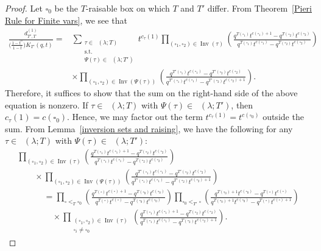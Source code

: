 \documentclass[10pt,a4paper]{amsart}
\numberwithin{equation}{section}
\theoremstyle{definition}
\DeclareMathOperator{\PSYT}{\mathrm{PSYT}_{\geq 0}}
\DeclareMathOperator{\Inv}{\mathrm{Inv}}
\begin{document}
\begin{proof}
 Let $\square_0$ be the $T$-raisable box on which $T$ and $T'$ differ. From Theorem~\ref{Pieri Rule for Finite vars}, we see that
 \begin{align*}
 \frac{d^{(1)}_{T',T}}{\bigl(\frac{1-t^n}{1-t}\bigr)K_{T'}(q,t)} ={}&
 \sum_{\substack{\tau \in \PSYT(\lambda;T) \\ \text{s.t.}\\ \Psi(\tau) \in \PSYT(\lambda;T')}}
 t^{c_{\tau}(1)}
 \prod_{(\square_1,\square_2) \in \Inv(\tau)} \left( \frac{q^{T(\square_1)}t^{c(\square_1) +1} - q^{T(\square_2)}t^{c(\square_2)}}{q^{T(\square_1)}t^{c(\square_1)} - q^{T(\square_2)}t^{c(\square_2)}} \right) \\
 &\times \prod_{(\square_1,\square_2) \in \Inv(\Psi(\tau))} \left( \frac{q^{T'(\square_1)}t^{c(\square_1)} - q^{T'(\square_2)}t^{c(\square_2)}}{q^{T'(\square_1)}t^{c(\square_1)} - q^{T'(\square_2)}t^{c(\square_2) +1}} \right).
\end{align*}
Therefore, it suffices to show that the sum on the right-hand side of the above equation is nonzero. If $\tau \in \PSYT(\lambda;T)$ with $\Psi(\tau) \in \PSYT(\lambda;T')$, then $c_{\tau}(1)= c(\square_0)$. Hence, we may factor out the term $t^{c_{\tau}(1)}= t^{c(\square_0)}$ outside the sum. From Lemma~\ref{inversion sets and raising}, we have the following for any $\tau \in \PSYT(\lambda;T)$ with $\Psi(\tau) \in \PSYT(\lambda;T')$:
\begin{gather*}
 \prod_{(\square_1,\square_2) \in \Inv(\tau)} \left( \frac{q^{T(\square_1)}t^{c(\square_1) +1} - q^{T(\square_2)}t^{c(\square_2)}}{q^{T(\square_1)}t^{c(\square_1)} - q^{T(\square_2)}t^{c(\square_2)}} \right)\\
 \qquad \times
 \prod_{(\square_1,\square_2) \in \Inv(\Psi(\tau))} \left( \frac{q^{T'(\square_1)}t^{c(\square_1)} - q^{T'(\square_2)}t^{c(\square_2)}}{q^{T'(\square_1)}t^{c(\square_1)} - q^{T'(\square_2)}t^{c(\square_2) +1}} \right) \\
 \phantom{ \qquad \times}{} = \prod_{\square <_{T} \square_0} \left( \frac{q^{T(\square)}t^{c(\square) +1} - q^{T(\square_0)}t^{c(\square_0)}}{q^{T(\square)}t^{c(\square)} - q^{T(\square_0)}t^{c(\square_0)}} \right) \prod_{\square_0 <_{T'} \square} \left( \frac{q^{T(\square_0)+1}t^{c(\square_0)} - q^{T(\square)}t^{c(\square)}}{q^{T(\square_0)+1}t^{c(\square_0)} - q^{T(\square)}t^{c(\square)+1}} \right) \\
 \phantom{ \qquad\times =}{} \times \prod_{\substack{(\square_1,\square_2) \in \Inv(\tau)\\ \square_i \neq \square_0}} \left( \frac{q^{T(\square_1)}t^{c(\square_1)+1} - q^{T(\square_2)}t^{c(\square_2)}}{q^{T(\square_1)}t^{c(\square_1)} - q^{T(\square_2)}t^{c(\square_2)+1}} \right).
\end{gather*}


\end{proof}
\end{document}
